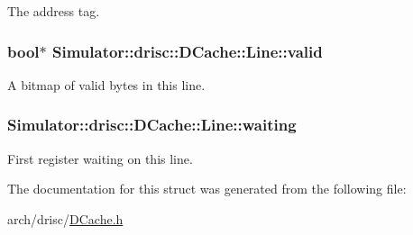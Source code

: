 The address tag. 

\hypertarget{struct_simulator_1_1drisc_1_1_d_cache_1_1_line_aee0ce0d4a531af641df200d47178953a}{
\subsubsection[{valid}]{\setlength{\rightskip}{0pt plus 5cm}bool$\ast$ Simulator\+::drisc\+::\+D\+Cache\+::\+Line\+::valid}}\label{struct_simulator_1_1drisc_1_1_d_cache_1_1_line_aee0ce0d4a531af641df200d47178953a}


A bitmap of valid bytes in this line. 

\hypertarget{struct_simulator_1_1drisc_1_1_d_cache_1_1_line_ad647618b60b3ee202afc191e1076f279}{
\subsubsection[{waiting}]{ Simulator\+::drisc\+::\+D\+Cache\+::\+Line\+::waiting}}\label{struct_simulator_1_1drisc_1_1_d_cache_1_1_line_ad647618b60b3ee202afc191e1076f279}


First register waiting on this line. 



The documentation for this struct was generated from the following file\+:\begin{DoxyCompactItemize}
\item 
arch/drisc/\hyperlink{_d_cache_8h}{D\+Cache.\+h}\end{DoxyCompactItemize}
